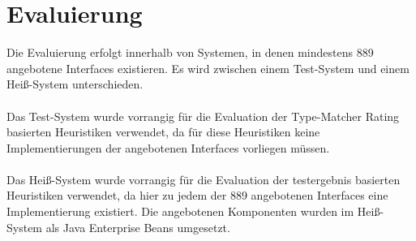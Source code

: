 \chapter{Evaluierung}
Die Evaluierung erfolgt innerhalb von Systemen, in denen mindestens 889 angebotene Interfaces existieren. Es wird zwischen einem Test-System und einem Heiß-System unterschieden.\\\\
Das Test-System wurde vorrangig für die Evaluation der Type-Matcher Rating basierten Heuristiken verwendet, da für diese Heuristiken keine Implementierungen der angebotenen Interfaces vorliegen müssen.\\\\
Das Heiß-System wurde vorrangig für die Evaluation der testergebnis basierten Heuristiken verwendet, da hier zu jedem der 889 angebotenen Interfaces eine Implementierung existiert. Die angebotenen Komponenten wurden  im Heiß-System als Java Enterprise Beans umgesetzt.


